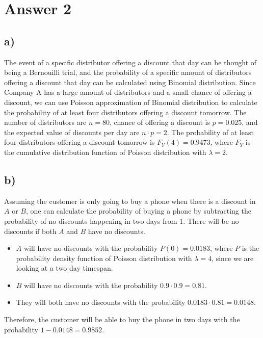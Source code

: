 \documentclass[12pt]{article}
\begin{document}
\newpage

\section*{Answer 2}

\subsection*{a)} 

The event of a specific distributor offering a discount that day can be thought
of being a Bernouilli trial, and the probability of a specific amount of
distributors offering a discount that day can be calculated using Binomial
distribution.
Since Company A has a large amount of distributors and a small chance of
offering a discount, we can use Poisson approximation of Binomial distribution
to calculate the probability of at least four distributors offering a discount
tomorrow.
\newline
The number of distributors are $n = 80$, chance of offering a discount is
$p = 0.025$, and the expected value of discounts per day are $n \cdot p = 2$.
The probability of at least four distributors offering a discount tomorrow is
$F_Y(4) = 0.9473$, where $F_Y$ is the cumulative distribution function of
Poisson distribution with $\lambda = 2$.

\subsection*{b)} 

Assuming the customer is only going to buy a phone when there is a discount
in $A$ or $B$, one can calculate the probability of buying a phone by
subtracting the probability of no discounts happening in two days from 1.
\newline
There will be no discounts if both $A$ and $B$ have no discounts.
\begin{itemize}
    \item $A$ will have no discounts with the probability $P(0) = 0.0183$,
    where $P$ is the probability density function of Poisson distribution with
    $\lambda = 4$, since we are looking at a two day timespan.
    \item $B$ will have no discounts with the probability
    $0.9 \cdot 0.9 = 0.81$.
    \item They will both have no discounts with the probability
    $0.0183 \cdot 0.81 = 0.0148$.
\end{itemize}
Therefore, the customer will be able to buy the phone in two days with the
probability $1 - 0.0148 = 0.9852$.
\end{document}
